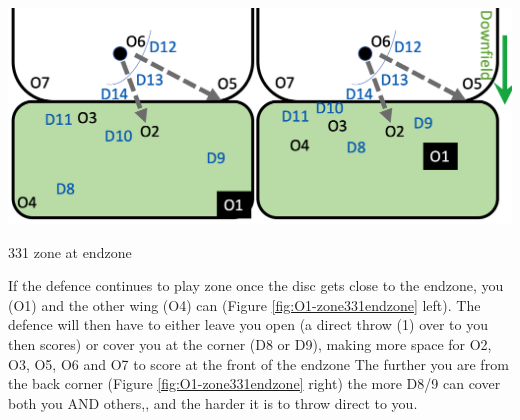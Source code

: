 \documentclass{tufte-handout}
\begin{document}
\begin{marginfigure}%
  \includegraphics[width=\linewidth]{O1-zone331endzone}
  \caption{331 zone at endzone}
  \label{fig:O1-zone331endzone}
\end{marginfigure}

If the defence 
continues to play zone 
once the disc 
gets close to the endzone, 
you (O1) 
and the other wing (O4) 
can 
(Figure \ref{fig:O1-zone331endzone} left).  
The defence 
will then have to either 
leave you open
(a direct throw 
(1) over to you then scores)
or cover you
at the corner
(D8 
or D9), 
making more space 
for O2, 
O3, 
O5, 
O6 and
O7 
to score 
at the front of the endzone
The further 
you are from the back corner 
(Figure \ref{fig:O1-zone331endzone} right)
the more D8/9 
can cover both you
AND others,, 
and the harder 
it is to throw direct to you.
\end{document}
